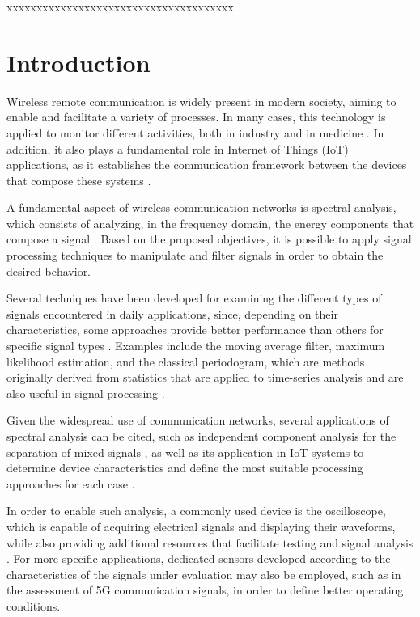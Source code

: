 \documentclass[conference]{IEEEtran}
\begin{document}
\begin{IEEEkeywords}
xxxxxxxxxxxxxxxxxxxxxxxxxxxxxxxxxxxxxx
\end{IEEEkeywords}

\section{Introduction}
Wireless remote communication is widely present in modern society, aiming to enable and facilitate a variety of processes. In many cases, this technology is applied to monitor different activities, both in industry and in medicine \cite{christ2011}. In addition, it also plays a fundamental role in Internet of Things (IoT) applications, as it establishes the communication framework between the devices that compose these systems \cite{wang2018}.

A fundamental aspect of wireless communication networks is spectral analysis, which consists of analyzing, in the frequency domain, the energy components that compose a signal \cite{oppenheim2010}. Based on the proposed objectives, it is possible to apply signal processing techniques to manipulate and filter signals in order to obtain the desired behavior.

Several techniques have been developed for examining the different types of signals encountered in daily applications, since, depending on their characteristics, some approaches provide better performance than others for specific signal types \cite{oppenheim2010}. Examples include the moving average filter, maximum likelihood estimation, and the classical periodogram, which are methods originally derived from statistics that are applied to time-series analysis and are also useful in signal processing \cite{kay1981}.

Given the widespread use of communication networks, several applications of spectral analysis can be cited, such as independent component analysis for the separation of mixed signals \cite{uddin2015}, as well as its application in IoT systems to determine device characteristics and define the most suitable processing approaches for each case \cite{shilpa2022}.

In order to enable such analysis, a commonly used device is the oscilloscope, which is capable of acquiring electrical signals and displaying their waveforms, while also providing additional resources that facilitate testing and signal analysis \cite{pereira2006}. For more specific applications, dedicated sensors developed according to the characteristics of the signals under evaluation may also be employed, such as in the assessment of 5G communication signals, in order to define better operating conditions\cite{adegoke2020}.
\end{document}

